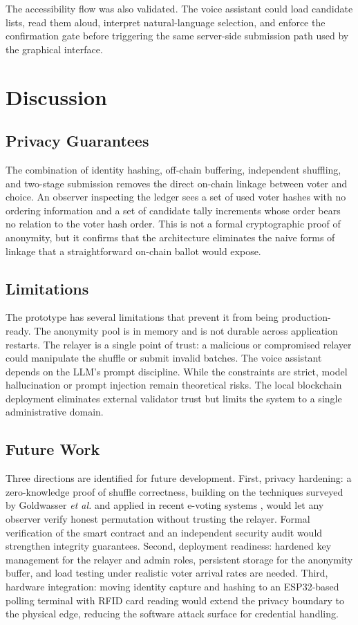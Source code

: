 \documentclass{ieeeaccess}
\begin{document}
The accessibility flow was also validated. The voice assistant could load candidate lists, read them aloud, interpret natural-language selection, and enforce the confirmation gate before triggering the same server-side submission path used by the graphical interface.

\section{Discussion}
\subsection{Privacy Guarantees}
The combination of identity hashing, off-chain buffering, independent shuffling, and two-stage submission removes the direct on-chain linkage between voter and choice. An observer inspecting the ledger sees a set of used voter hashes with no ordering information and a set of candidate tally increments whose order bears no relation to the voter hash order. This is not a formal cryptographic proof of anonymity, but it confirms that the architecture eliminates the naive forms of linkage that a straightforward on-chain ballot would expose.

\subsection{Limitations}
The prototype has several limitations that prevent it from being production-ready. The anonymity pool is in memory and is not durable across application restarts. The relayer is a single point of trust: a malicious or compromised relayer could manipulate the shuffle or submit invalid batches. The voice assistant depends on the LLM's prompt discipline. While the constraints are strict, model hallucination or prompt injection remain theoretical risks. The local blockchain deployment eliminates external validator trust but limits the system to a single administrative domain.

\subsection{Future Work}
Three directions are identified for future development. First, privacy hardening: a zero-knowledge proof of shuffle correctness, building on the techniques surveyed by Goldwasser \emph{et al.} \cite{Goldwasser1989} and applied in recent e-voting systems \cite{Emami2023, Sangraula2025}, would let any observer verify honest permutation without trusting the relayer. Formal verification of the smart contract and an independent security audit would strengthen integrity guarantees. Second, deployment readiness: hardened key management for the relayer and admin roles, persistent storage for the anonymity buffer, and load testing under realistic voter arrival rates are needed. Third, hardware integration: moving identity capture and hashing to an ESP32-based polling terminal with RFID card reading would extend the privacy boundary to the physical edge, reducing the software attack surface for credential handling.
\end{document}
